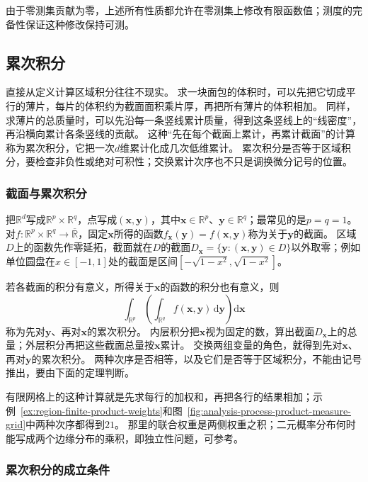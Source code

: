 由于零测集贡献为零，上述所有性质都允许在零测集上修改有限函数值；测度的完备性保证这种修改保持可测。

\subsection{累次积分}
\label{sec:multivariable-iterated-integrals}

直接从定义计算区域积分往往不现实。
求一块面包的体积时，可以先把它切成平行的薄片，每片的体积约为截面面积乘片厚，再把所有薄片的体积相加。
同样，求薄片的总质量时，可以先沿每一条竖线累计质量，得到这条竖线上的“线密度”，再沿横向累计各条竖线的贡献。
这种“先在每个截面上累计，再累计截面”的计算称为累次积分，它把一次$d$维累计化成几次低维累计。
累次积分是否等于区域积分，要检查非负性或绝对可积性；交换累计次序也不只是调换微分记号的位置。

\subsubsection{截面与累次积分}

把$\mathbb R^d$写成$\mathbb R^p\times\mathbb R^q$，点写成$(\bm x,\bm y)$，其中$\bm x\in\mathbb R^p$、$\bm y\in\mathbb R^q$；最常见的是$p=q=1$。
对$f:\mathbb R^p\times\mathbb R^q\to\overline{\mathbb R}$，固定$\bm x$所得的函数$f_{\bm x}(\bm y)=f(\bm x,\bm y)$称为关于$\bm y$的截面。
区域$D$上的函数先作零延拓，截面就在$D$的截面$D_{\bm x}=\{\bm y:(\bm x,\bm y)\in D\}$以外取零；例如单位圆盘在$x\in[-1,1]$处的截面是区间$[-\sqrt{1-x^2},\sqrt{1-x^2}]$。

若各截面的积分有意义，所得关于$\bm x$的函数的积分也有意义，则
\[
 \int_{\mathbb R^p}\left(\int_{\mathbb R^q}f(\bm x,\bm y)\,\mathrm d\bm y\right)\mathrm d\bm x
\]
称为先对$\bm y$、再对$\bm x$的累次积分。
内层积分把$\bm x$视为固定的数，算出截面$D_{\bm x}$上的总量；外层积分再把这些截面总量按$\bm x$累计。
交换两组变量的角色，就得到先对$\bm x$、再对$\bm y$的累次积分。
两种次序是否相等，以及它们是否等于区域积分，不能由记号推出，要由下面的定理判断。

有限网格上的这种计算就是先求每行的加权和，再把各行的结果相加；示例~\ref{ex:region-finite-product-weights}和图~\ref{fig:analysis-process-product-measure-grid}中两种次序都得到$21$。
那里的联合权重是两侧权重之积；二元概率分布何时能写成两个边缘分布的乘积，即独立性问题，可参考。

\subsubsection{累次积分的成立条件}

